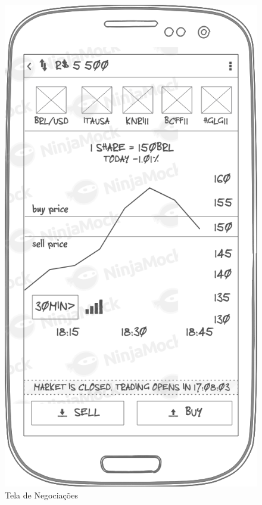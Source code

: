 \begin{figure}[H]
  \caption{\label{fig:mock_login}Tela de Negociações}
  \centering
  \includegraphics[scale=0.4]{imagens/mocks/tradezone.png}
\end{figure}